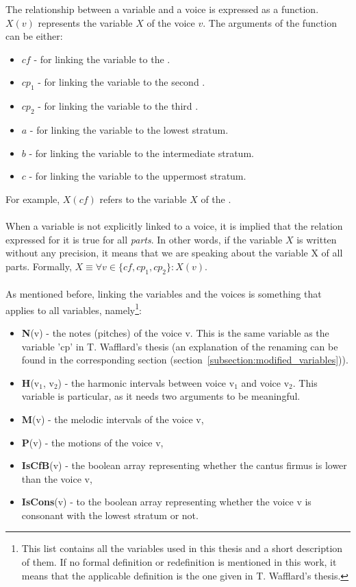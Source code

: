 The relationship between a variable and a voice is expressed as a function. $X(v)$ represents the variable $X$ of the voice $v$. The arguments of the function can be either:
\begin{itemize}
    \item $\mathit{cf}$ - for linking the variable to the \cf.
    \item $cp_1$ - for linking the variable to the second \cp.
    \item $cp_2$ - for linking the variable to the third \cp.
    \item $a$ - for linking the variable to the lowest stratum.
    \item $b$ - for linking the variable to the intermediate stratum.
    \item $c$ - for linking the variable to the uppermost stratum.
  \end{itemize}

\noindent For example, $X(\mathit{cf})$ refers to the variable $X$ of the \cf.

\paragraph{}
When a variable is not explicitly linked to a voice, it is implied that the relation expressed for it is true for all \textit{parts}. In other words, if the variable $X$ is written without any precision, it means that we are speaking about the variable X of all parts. Formally, $X \equiv \forall v \in \{\mathit{cf}, cp_1, cp_2\}: X(v)$.

\paragraph{}
\noindent As mentioned before, linking the variables and the voices is something that applies to all variables, namely\footnote{This list contains all the variables used in this thesis and a short description of them. If no formal definition or redefinition is mentioned in this work, it means that the applicable definition is the one given in T. Wafflard's thesis.}:
\begin{itemize}
    \item \textbf{N}(v) - the notes (pitches) of the voice v. This is the same variable as the variable 'cp' in T. Wafflard's thesis (an explanation of the renaming can be found in the corresponding section (section~\ref{subsection:modified_variables})).
    \item \textbf{H}(v$_1$, v$_2$) - the harmonic intervals between voice v$_1$ and voice v$_2$. This variable is particular, as it needs two arguments to be meaningful.
    \item \textbf{M}(v) - the melodic intervals of the voice v, 
    \item \textbf{P}(v) - the motions of the voice v, 
    \item \textbf{IsCfB}(v) - the boolean array representing whether the cantus firmus is lower than the voice v,
    \item \textbf{IsCons}(v) - to the boolean array representing whether the voice v is consonant with the lowest stratum or not.
\end{itemize}

